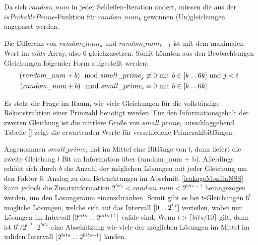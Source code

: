 Da sich $random\_num$ in jeder Schleifen-Iteration ändert, müssen die aus der $isProbablePrime$-Funktion für $random\_num_k$ gewonnen (Un)gleichungen  angepasst werden.

Die Differenz von $random\_num_k$ und $random\_num_{k+1}$ ist mit dem maximalen Wert im $adds$-Array, also 6 gleichzusetzen.
Somit könnten aus den Beobachtungen Gleichungen folgender Form aufgestellt werden:
\begin{align*}
    (random\_num + b) \mod small\_prime_j \not\equiv 0 &\text{ mit } b \in [k\mathrel{{.}\,{.}}\nobreak6k] \text{ und } j < i\\
    (random\_num + b) \mod small\_prime_i \equiv 0 &\text{ mit } b \in [k\mathrel{{.}\,{.}}\nobreak6k]
\end{align*}

Es steht die Frage im Raum, wie viele Gleichungen für die vollständige Rekonstruktion einer Primzahl benötigt werden.
Für den Informationsgehalt der zweiten Gleichung ist die mittlere Größe von $small\_prime_i$ ausschlaggebend.
Tabelle \ref{} zeigt die erwartenden Werte für verschiedene Primezahlbitlängen. 

Angenommen $small\_prime_i$ hat im Mittel eine Bitlänge von $l$, dann liefert die zweite Gleichung $l$ Bit an Information über (random\_num + b).
Allerdings erhöht sich durch $b$ die Anzahl der möglichen Lösungen mit jeder Gleichung um den Faktor 6.
Analog zu den Betrachtungen im Abschnitt \ref{leakageMozillaNSS} kann jedoch die Zusatzinformation $2^{bits} < random\_num < 2^{bits+1}$ herangezogen werden, um den Lösungsraum einzuschränken.
Somit gibt es bei $t$-Gleichungen $6^t$ mögliche Lösungen, welche sich auf das Intervall $[0 \mathrel{{.}\,{.}}\nobreak2^{l\cdot t}]$ verteilen, wobei nur Lösungen im Intervall $[2^{bits} \mathrel{{.}\,{.}}\nobreak 2^{bits+1}]$ valide sind.
Wenn $t > \lceil bits/10 \rceil$ gilt, dann ist $6^t/2^{l \cdot t} \cdot 2^{bits}$ eine Abschätzung wie viele der möglichen Lösungen im Mittel im validen Intervall $[2^{bits} \mathrel{{.}\,{.}}\nobreak 2^{bits+1}]$ landen.

